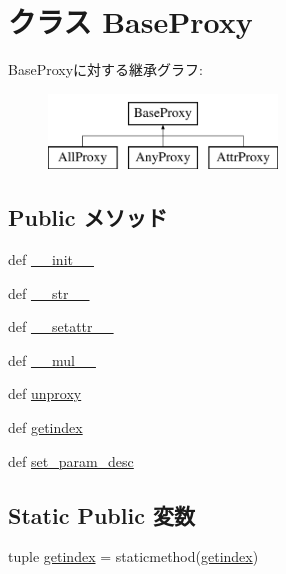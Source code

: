 \hypertarget{classm5_1_1proxy_1_1BaseProxy}{
\section{クラス BaseProxy}
\label{classm5_1_1proxy_1_1BaseProxy}
}
BaseProxyに対する継承グラフ:\begin{figure}[H]
\begin{center}
\leavevmode
\includegraphics[height=2cm]{classm5_1_1proxy_1_1BaseProxy}
\end{center}
\end{figure}
\subsection*{Public メソッド}
\begin{DoxyCompactItemize}
\item 
def \hyperlink{classm5_1_1proxy_1_1BaseProxy_ac775ee34451fdfa742b318538164070e}{\_\-\_\-init\_\-\_\-}
\item 
def \hyperlink{classm5_1_1proxy_1_1BaseProxy_aa7a4b9bc0941308e362738503137460e}{\_\-\_\-str\_\-\_\-}
\item 
def \hyperlink{classm5_1_1proxy_1_1BaseProxy_a6287b7a16286568d5442b6e2e90215b5}{\_\-\_\-setattr\_\-\_\-}
\item 
def \hyperlink{classm5_1_1proxy_1_1BaseProxy_a48a7267a9f9d29d1514e713744202146}{\_\-\_\-mul\_\-\_\-}
\item 
def \hyperlink{classm5_1_1proxy_1_1BaseProxy_a587cd3c1e899640dc09d63793aa8093b}{unproxy}
\item 
def \hyperlink{classm5_1_1proxy_1_1BaseProxy_a6e2936a185966ecf10de41aca4cd4ec8}{getindex}
\item 
def \hyperlink{classm5_1_1proxy_1_1BaseProxy_aa1d1be95abe1fe821c85b7d03dd57f12}{set\_\-param\_\-desc}
\end{DoxyCompactItemize}
\subsection*{Static Public 変数}
\begin{DoxyCompactItemize}
\item 
tuple \hyperlink{classm5_1_1proxy_1_1BaseProxy_afe8b888cbbc5e1ffac40bc80422bbaba}{getindex} = staticmethod(\hyperlink{classm5_1_1proxy_1_1BaseProxy_afe8b888cbbc5e1ffac40bc80422bbaba}{getindex})
\end{DoxyCompactItemize}
